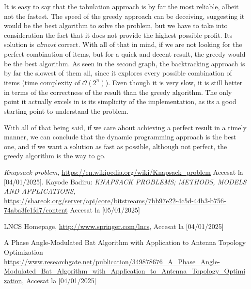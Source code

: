 \documentclass{llncs}
\begin{document}
It is easy to say that the tabulation approach is by far the most reliable, albeit
not the fastest. The speed of the greedy approach can be deceiving, suggesting it would be
the best algorithm to solve the problem, but we have to take into consideration the fact
that it does not provide the highest possible profit. Its solution is \textit{almost} correct.
With all of that in mind, if we are not looking for the perfect combination of items, but
for a quick and decent result, the greedy would be the best algorithm. As seen in the second graph,
the backtracking approach is by far the slowest of them all, since it explores every possible combination of items
(time complexity of $\mathcal{O}(2^n)$). Even though it is very slow, it is still better in terms of
the correctness of the result than the greedy algorithm. The only point it actually excels in
is its simplicity of the implementation, as its a good starting point to understand the problem.

With all of that being said, if we care about achieving a perfect result in a timely manner,
we can conclude that the dynamic programming approach is the best one, and if we want a
solution as fast as possible, although not perfect, the greedy algorithm is the way to go.
%
%
%
% 
% 
%
\begin{thebibliography}{8}
\emph{Knapsack problem}, \url{https://en.wikipedia.org/wiki/Knapsack_problem} Accesat la [04/01/2025].
Kayode Badiru: \emph{KNAPSACK PROBLEMS; METHODS, MODELS AND APPLICATIONS},
\url{https://shareok.org/server/api/core/bitstreams/7bb97e22-4c5d-44b3-b756-74aba3fc1fd7/content} 
Accesat la [05/01/2025]

LNCS Homepage, \url{http://www.springer.com/lncs}, Accesat la [04/01/2025]

A Phase Angle-Modulated Bat Algorithm with Application to Antenna Topology Optimization
\url{https://www.researchgate.net/publication/349878676_A_Phase_Angle-Modulated_Bat_Algorithm_with_Application_to_Antenna_Topology_Optimization}, Accesat la [04/01/2025]

\end{thebibliography}
\end{document}

